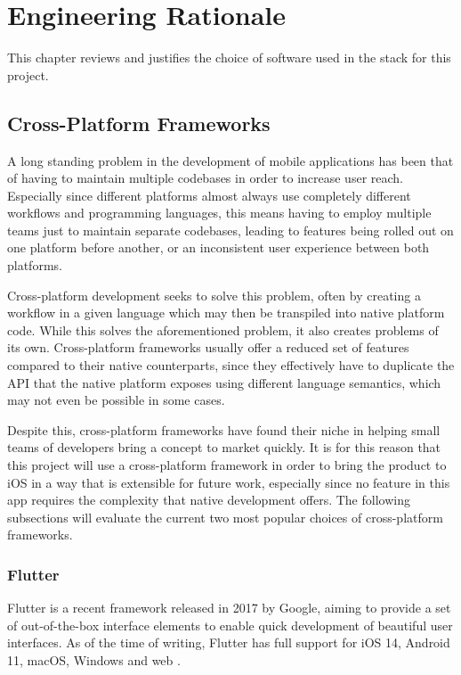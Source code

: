 \chapter{Engineering Rationale}
This chapter reviews and justifies the choice of software used in the stack for this project.

\section{Cross-Platform Frameworks}
A long standing problem in the development of mobile applications has been that of having to maintain multiple codebases in order to increase user reach. Especially since different platforms almost always use completely different workflows and programming languages, this means having to employ multiple teams just to maintain separate codebases, leading to features being rolled out on one platform before another, or an inconsistent user experience between both platforms.

Cross-platform development seeks to solve this problem, often by creating a workflow in a given language which may then be transpiled into native platform code. While this solves the aforementioned problem, it also creates problems of its own. Cross-platform frameworks usually offer a reduced set of features compared to their native counterparts, since they effectively have to duplicate the API that the native platform exposes using different language semantics, which may not even be possible in some cases.

Despite this, cross-platform frameworks have found their niche in helping small teams of developers bring a concept to market quickly. It is for this reason that this project will use a cross-platform framework in order to bring the product to iOS in a way that is extensible for future work, especially since no feature in this app requires the complexity that native development offers. The following subsections will evaluate the current two most popular choices of cross-platform frameworks.

\subsection{Flutter}
Flutter is a recent framework released in 2017 by Google, aiming to provide a set of out-of-the-box interface elements to enable quick development of beautiful user interfaces. As of the time of writing, Flutter has full support for iOS 14, Android 11, macOS, Windows and web \cite{fluttersupportedplatforms}.

